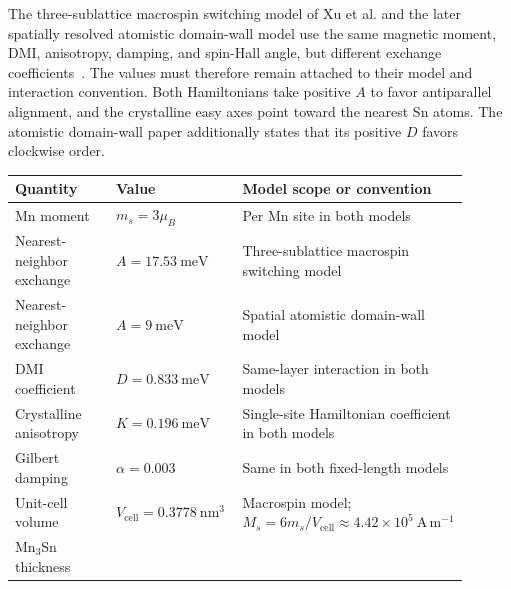 The three-sublattice macrospin switching model of Xu et al. and the later
spatially resolved atomistic domain-wall model use the same magnetic moment,
DMI, anisotropy, damping, and spin-Hall angle, but different exchange
coefficients~\cite{xu2024mn3sn,xu2025mn3sn-domain-wall}.  The values must
therefore remain attached to their model and interaction convention.  Both
Hamiltonians take positive $A$ to favor antiparallel alignment, and the
crystalline easy axes point toward the nearest Sn atoms.  The atomistic
domain-wall paper additionally states that its positive $D$ favors clockwise
order.

\begin{table}[htbp]
    \centering
    \small
    \renewcommand{\arraystretch}{1.15}
    \begin{tabular}{p{0.23\linewidth}p{0.29\linewidth}p{0.38\linewidth}}
        \hline
        Quantity & Value                                              & Model scope or convention \\
        \hline
        Mn moment
                 & $m_s=3\mu_B$
                 & Per Mn site in both models                                                     \\
        Nearest-neighbor exchange
                 & $A=17.53\ \mathrm{meV}$
                 & Three-sublattice macrospin switching model                                     \\
        Nearest-neighbor exchange
                 & $A=9\ \mathrm{meV}$
                 & Spatial atomistic domain-wall model                                            \\
        DMI coefficient
                 & $D=0.833\ \mathrm{meV}$
                 & Same-layer interaction in both models                                          \\
        Crystalline anisotropy
                 & $K=0.196\ \mathrm{meV}$
                 & Single-site Hamiltonian coefficient in both models                             \\
        Gilbert damping
                 & $\alpha=0.003$
                 & Same in both fixed-length models                                               \\
        Unit-cell volume
                 & $V_{\mathrm{cell}}=0.3778\ \mathrm{nm^3}$
                 & Macrospin model; $M_s=6m_s/V_{\mathrm{cell}}
                                        \approx4.42\times10^5\ \mathrm{A\,m^{-1}}$                \\
        Mn$_3$Sn thickness

\end{tabular}
\end{table}
